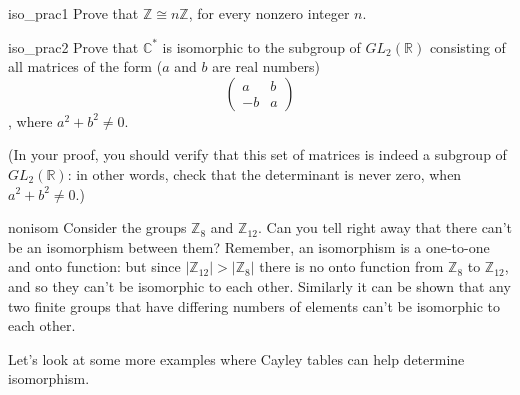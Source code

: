 \begin{exercise}{iso_prac1}
Prove that ${\mathbb Z} \cong n{\mathbb Z}$,  for every nonzero integer $n$.
\end{exercise}
 
\begin{exercise}{iso_prac2}
Prove that ${\mathbb C}^\ast$ is isomorphic to the subgroup of $GL_2(
{\mathbb R} )$ consisting of all  matrices of the form ($a$ and $b$ are real numbers)
\[
\begin{pmatrix}
a & b \\
-b & a
\end{pmatrix}
\], where $a^2 + b^2 \neq 0$.

\noindent
(In your proof, you should verify that this set of matrices is indeed a subgroup of $GL_2(
{\mathbb R} )$: in other words, check that the determinant is never zero, when $a^2 + b^2 \neq 0$.)
\end{exercise}


\begin{example}{nonisom}
Consider the groups ${\mathbb Z}_8$ and ${\mathbb Z}_{12}$. Can you tell right away that there can't be an isomorphism between them?  Remember, an isomorphism is a one-to-one and onto function: but since 
$|{\mathbb Z}_{12}|>|{\mathbb Z}_{8}|$ there is no onto function from ${\mathbb Z}_8$ to ${\mathbb Z}_{12}$, and so they can't be isomorphic to each other.  Similarly it can be shown that any two finite groups that have differing numbers of elements can't be isomorphic to each other.
\end{example}

Let's look at some more examples where Cayley tables can help determine isomorphism.

